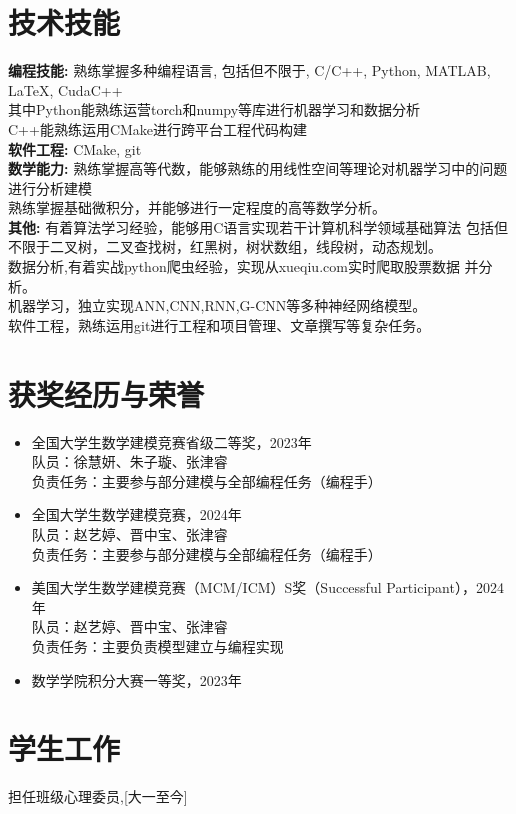 \documentclass[a4paper,10pt]{article}
\begin{document}
\section*{技术技能}
\textbf{编程技能:} 熟练掌握多种编程语言, 包括但不限于, C/C++, Python, MATLAB, LaTeX, CudaC++  \\
其中Python能熟练运营torch和numpy等库进行机器学习和数据分析 \\
C++能熟练运用CMake进行跨平台工程代码构建 \\
\textbf{软件工程:} CMake, git \\
\textbf{数学能力:} 熟练掌握高等代数，能够熟练的用线性空间等理论对机器学习中的问题进行分析建模 \\
熟练掌握基础微积分，并能够进行一定程度的高等数学分析。\\
\textbf{其他:} 有着算法学习经验，能够用C语言实现若干计算机科学领域基础算法
包括但不限于二叉树，二叉查找树，红黑树，树状数组，线段树，动态规划。\\
数据分析,有着实战python爬虫经验，实现从xueqiu.com实时爬取股票数据
并分析。\\
机器学习，独立实现ANN,CNN,RNN,G-CNN等多种神经网络模型。\\
软件工程，熟练运用git进行工程和项目管理、文章撰写等复杂任务。

\section*{获奖经历与荣誉}
\begin{itemize}
    \item 全国大学生数学建模竞赛省级二等奖，2023年 \\
          队员：徐慧妍、朱子璇、张津睿 \\
          负责任务：主要参与部分建模与全部编程任务（编程手）
    \item 全国大学生数学建模竞赛，2024年 \\
          队员：赵艺婷、晋中宝、张津睿 \\
          负责任务：主要参与部分建模与全部编程任务（编程手）
    \item 美国大学生数学建模竞赛（MCM/ICM）S奖（Successful Participant），2024年 \\
          队员：赵艺婷、晋中宝、张津睿 \\
          负责任务：主要负责模型建立与编程实现
    \item 数学学院积分大赛一等奖，2023年
\end{itemize}

\section*{学生工作}
担任班级心理委员,[大一至今]
\end{document}
